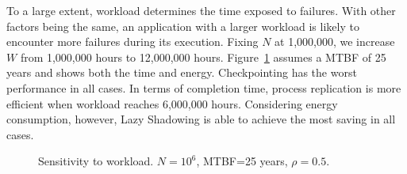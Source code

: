 To a large extent, workload determines the time exposed to failures. With other factors being the same, an application with a larger workload is likely to encounter more failures during its execution. %
Fixing $N$ at 1,000,000, we increase $W$ from 1,000,000 hours to 12,000,000 hours. Figure~\ref{fig:w25} assumes a MTBF of 25 years and shows both the time and energy. Checkpointing has the worst performance in all cases. In terms of completion time, process replication is more efficient when workload reaches 6,000,000 hours. Considering energy consumption, however, Lazy Shadowing is able to achieve the most saving in all cases. %

\begin{figure}[!t]
	\begin{center}
	\end{center}
	\vskip -0.04in 
	\caption{Sensitivity to workload. $N=10^6$, MTBF=25 years, $\rho=0.5$.}
	\label{fig:w25}
\end{figure}
